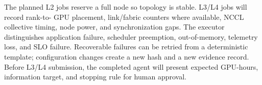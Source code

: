 The planned L2 jobs reserve a full node so topology is stable.  L3/L4 jobs will
record rank-to-
GPU placement, link/fabric counters where available, NCCL collective timing,
node power, and synchronization gaps.  The executor distinguishes application
failure, scheduler preemption, out-of-memory, telemetry loss, and SLO failure.
Recoverable failures can be retried from a deterministic template; configuration
changes create a new hash and a new evidence record.  Before L3/L4 submission,
the completed agent will present expected GPU-hours, information target, and
stopping rule for human approval.
